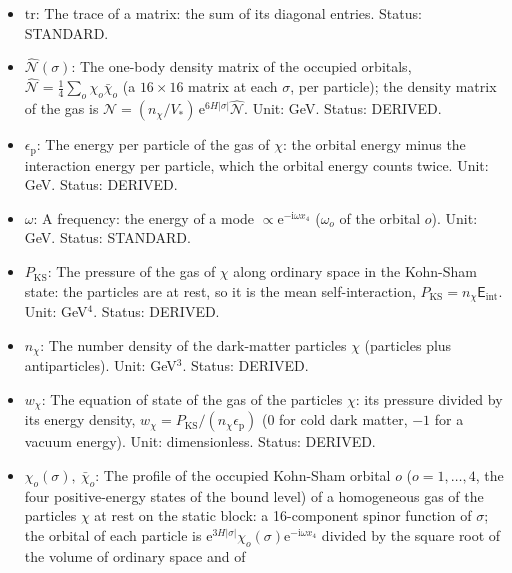 \documentclass[
  10pt,
]{article}
\begin{document}
\begin{itemize}
  \(\hat\rho(\sigma)\): The scalar density of the occupied orbitals,
  \(\hat\rho = \frac14\sum_o\bar\chi_o\chi_o\) (per particle); the
  scalar density of the gas is
  \(n_{\mathrm{s}} = (n_\chi/V_*)\,\mathrm{e}^{6H\lvert\sigma\rvert}\hat\rho\).
  Unit: GeV. Status: DERIVED.
\item
  \(\mathrm{tr}\): The trace of a matrix: the sum of its diagonal
  entries. Status: STANDARD.
\item
  \(\hat{\mathcal{N}}(\sigma)\): The one-body density matrix of the
  occupied orbitals,
  \(\hat{\mathcal{N}} = \frac14\sum_o\chi_o\bar\chi_o\) (a
  \(16 \times 16\) matrix at each \(\sigma\), per particle); the density
  matrix of the gas is
  \(\mathcal{N} = (n_\chi/V_*)\,\mathrm{e}^{6H\lvert\sigma\rvert}\hat{\mathcal{N}}\).
  Unit: GeV. Status: DERIVED.
\item
  \(\epsilon_{\mathrm{p}}\): The energy per particle of the gas of
  \(\chi\): the orbital energy minus the interaction energy per
  particle, which the orbital energy counts twice. Unit: GeV. Status:
  DERIVED.
\item
  \(\omega\): A frequency: the energy of a mode
  \(\propto \mathrm{e}^{-\mathrm{i}\omega x_4}\) (\(\omega_o\) of the
  orbital \(o\)). Unit: GeV. Status: STANDARD.
\item
  \(P_{\mathrm{KS}}\): The pressure of the gas of \(\chi\) along
  ordinary space in the Kohn-Sham state: the particles are at rest, so
  it is the mean self-interaction,
  \(P_{\mathrm{KS}} = n_\chi\mathsf{E}_{\mathrm{int}}\). Unit:
  GeV\(^4\). Status: DERIVED.
\item
  \(n_\chi\): The number density of the dark-matter particles \(\chi\)
  (particles plus antiparticles). Unit: GeV\(^3\). Status: DERIVED.
\item
  \(w_\chi\): The equation of state of the gas of the particles
  \(\chi\): its pressure divided by its energy density,
  \(w_\chi = P_{\mathrm{KS}}/(n_\chi\epsilon_{\mathrm{p}})\) (0 for cold
  dark matter, \(-1\) for a vacuum energy). Unit: dimensionless. Status:
  DERIVED.
\item
  \(\chi_o(\sigma),\ \bar\chi_o\): The profile of the occupied Kohn-Sham
  orbital \(o\) (\(o = 1, \dots, 4\), the four positive-energy states of
  the bound level) of a homogeneous gas of the particles \(\chi\) at
  rest on the static block: a 16-component spinor function of
  \(\sigma\); the orbital of each particle is
  \(\mathrm{e}^{3H\lvert\sigma\rvert}\chi_o(\sigma)\mathrm{e}^{-\mathrm{i}\omega x_4}\)
  divided by the square root of the volume of ordinary space and of

\end{itemize}
\end{document}
